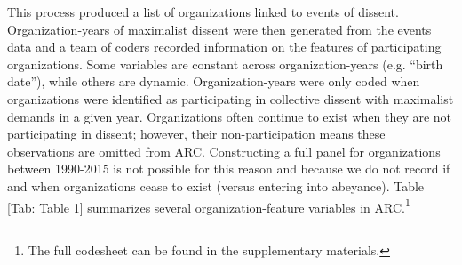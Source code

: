 This process produced a list of organizations linked to events of dissent.
Organization-years of maximalist dissent were then generated from the events
data and a team of coders recorded information on the features of participating
organizations. Some variables are constant across organization-years (e.g.
``birth date''), while others are dynamic. Organization-years were only coded
when organizations were identified as participating in collective dissent with
maximalist demands in a given year. Organizations often continue to exist when
they are not participating in dissent; however, their non-participation means
these observations are omitted from ARC. Constructing a full panel for
organizations between 1990-2015 is not possible for this reason and because we
do not record if and when organizations cease to exist (versus entering into
abeyance). Table \ref{Tab: Table 1} summarizes several organization-feature
variables in ARC.\footnote{The full codesheet can be found in the supplementary
materials.} 

